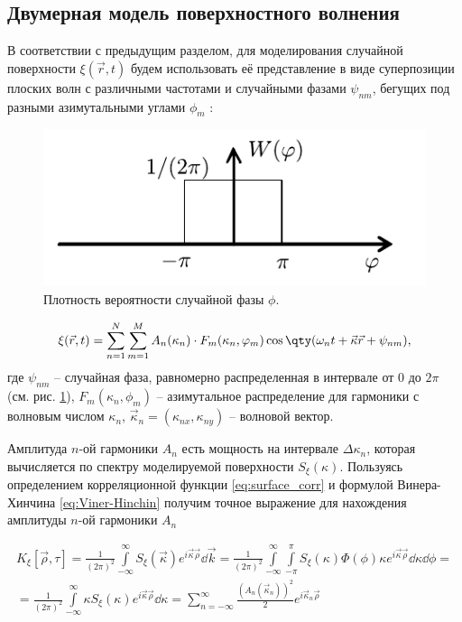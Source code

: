 \subsection{Двумерная модель поверхностного волнения}%
\label{sec:dvumernaia_model_poverkhnostnogo_volneniia}

В соответствии с предыдущим разделом, для моделирования случайной поверхности
$\xi(\vec r,t)$ будем использовать её представление в виде суперпозиции
плоских волн с различными частотами и случайными фазами $\psi_{nm}$, бегущих
под разными азимутальными углами $\phi_m$ \cite{karaev}:
\begin{figure}[H]
    \centering
    \includegraphics[scale=1]{fig/image65}
    \caption{Плотность вероятности случайной фазы $\phi$.}
    \label{fig:phase}
\end{figure}

\begin{equation}
    \label{eq:surface2d}
    \xi(\vec r,t) = \sum\limits_{n=1}^{N} \sum\limits_{m=1}^{M}
    A_n(\kappa_n) \cdot
    F_m(\kappa_n,\phi_m) \cos \qty(\omega_n t + \vec \kappa \vec r + \psi_{nm}),
\end{equation}
где $\psi_{nm}$ -- случайная фаза, равномерно распределенная в интервале от $0$
до $2 \pi$ (см. рис. \ref{fig:phase}), $F_m(\kappa_n, \phi_m)$ -- азимутальное
распределение для гармоники с волновым числом  $\kappa_n$,  $\vec \kappa_n =
(\kappa_{nx}, \kappa_{ny})$ -- 
волновой вектор. 

Амплитуда $n$-ой гармоники $A_n$ есть
мощность на интервале $\Delta \kappa_n$, которая вычисляется по спектру моделируемой
поверхности $S_\xi(\kappa)$. Пользуясь определением корреляционной
функции \eqref{eq:surface_corr} и формулой Винера-Хинчина
\eqref{eq:Viner-Hinchin} получим точное выражение для нахождения амплитуды
$n$-ой гармоники  $A_n$

\begin{gather}
    K_{\xi}[\vec \rho, \tau] = \frac{1}{(2 \pi)^2}  \int\limits_{-\infty}^{\infty}  S_{\xi}(\vec \kappa) e^{i \vec \kappa \vec \rho} \dd \vec k = 
    \frac{1}{(2 \pi)^2} 
        \int\limits_{-\infty}^{\infty}
        \int\limits_{- \pi}^{\pi} 
    S_\xi(\kappa) \Phi(\phi) \kappa e^{i \vec \kappa\vec \rho} \dd \kappa \dd \phi = \\
    = \frac{1}{(2 \pi)^2} \int\limits_{-\infty}^{\infty} \kappa S_\xi
    (\kappa) e^{i \vec \kappa 
    \vec \rho} \dd \kappa = \sum\limits_{n=-\infty}^{\infty} \frac{(A_n(\vec
\kappa_n))^2}{2} e^{i \vec \kappa_n \vec \rho} 
\end{gather}

